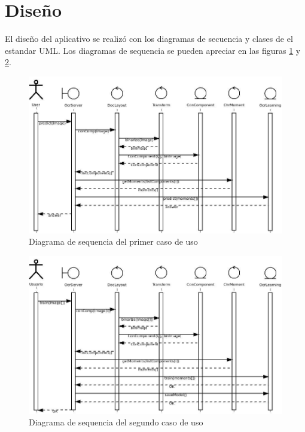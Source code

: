 \documentclass[a4paper, 11pt, oneside]{report}
\begin{document}
\section{Diseño}

El diseño del aplicativo se realizó con los diagramas de secuencia y clases de el estandar UML. Los diagramas de sequencia se pueden apreciar en las figuras \ref{fig:sequence1} y \ref{fig:sequence2}.

\begin{figure}
\begin{center}
\includegraphics[width=20cm]{diagrams/sequence1.jpeg}
\end{center}
\caption{Diagrama de sequencia del primer caso de uso}
\label{fig:sequence1}
\end{figure}

\begin{figure}
\begin{center}
\includegraphics[width=20cm]{diagrams/sequence2.jpeg}
\end{center}
\caption{Diagrama de sequencia del segundo caso de uso}
\label{fig:sequence2}
\end{figure}
\end{document}
